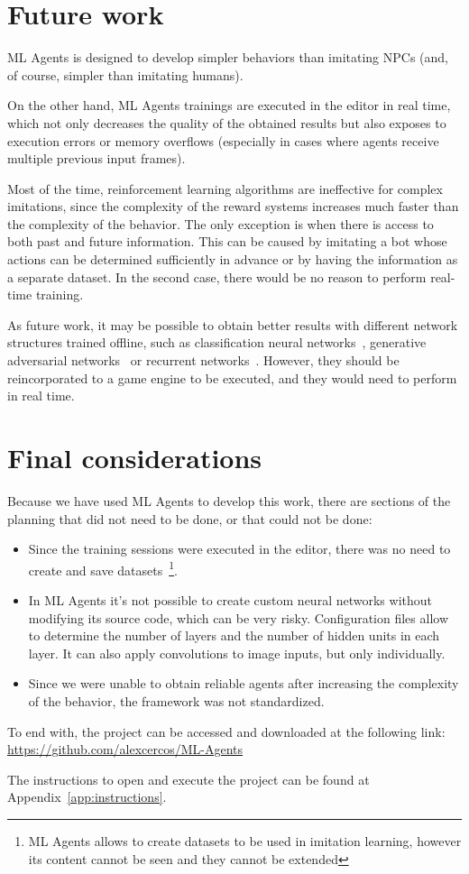 \section{Future work}


ML Agents is designed to develop simpler behaviors than imitating NPCs (and, of course, simpler than imitating humans).

On the other hand, ML Agents trainings are executed in the editor in real time, which not only decreases the quality of the obtained results but also exposes to execution errors or memory overflows (especially in cases where agents receive multiple previous input frames).

Most of the time, reinforcement learning algorithms are ineffective for complex imitations, since the complexity of the reward systems increases much faster than the complexity of the behavior. The only exception is when there is access to both past and future information. This can be caused by imitating a bot whose actions can be determined sufficiently in advance or by having the information as a separate dataset. In the second case, there would be no reason to perform real-time training.

As future work, it may be possible to obtain better results with different network structures trained offline, such as classification neural networks~\cite{clasnn}, generative adversarial networks~\cite{radford2015unsupervised} or recurrent networks~\cite{zaremba2014recurrent}. However, they should be reincorporated to a game engine to be executed, and they would need to perform in real time.


\section{Final considerations}

Because we have used ML Agents to develop this work, there are sections of the planning that did not need to be done, or that could not be done:

\begin{itemize}
	\item Since the training sessions were executed in the editor, there was no need to create and save datasets~\footnote{ML Agents allows to create datasets to be used in imitation learning, however its content cannot be seen and they cannot be extended}.
	\item In ML Agents it's not possible to create custom neural networks without modifying its source code, which can be very risky. Configuration files allow to determine the number of layers and the number of hidden units in each layer. It can also apply convolutions to image inputs, but only individually. 
	\item Since we were unable to obtain reliable agents after increasing the complexity of the behavior, the framework was not standardized.
\end{itemize}

To end with, the project can be accessed and downloaded at the following link: \url{https://github.com/alexcercos/ML-Agents}

The instructions to open and execute the project can be found at Appendix~\ref{app:instructions}.

